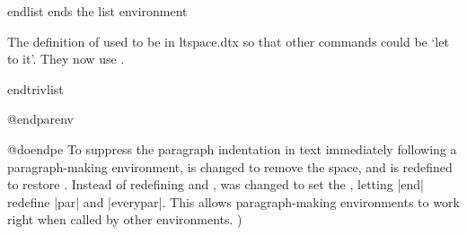  \begin{docCommand}{endlist} {  }
  ends the list environment
 \end{docCommand}
     \begin{teX}
\def\endlist{%
  \global\advance\@listdepth\m@ne
  \endtrivlist}
    \end{teX}
 

    The definition of  used to be in ltspace.dtx 
    so that other commands could be `let to it'.  
    They now use .
 \begin{docCommand}{endtrivlist}{}
 \end{docCommand}
 
    \begin{teX}
\def\endtrivlist{%
  \if@inlabel
    \leavevmode
    \global \@inlabelfalse
  \fi
  \if@newlist
    \@noitemerr
    \global \@newlistfalse
  \fi
  \ifhmode\unskip \par
    \end{teX}
    We also check if we are in math mode and issue an error message
    if so (hoping that |\@currenvir| resolves suitably). Otherwise
    the usual ``perhaps a missing item'' error will get triggered
    later which is confusing.
 \changes{v1.0s}{2002/10/28}{Check for math mode (pr/3437)}
    \begin{teX}
  \else
    \@inmatherr{\end{\@currenvir}}%
  \fi
  \if@noparlist \else
    \ifdim\lastskip >\z@
      \@tempskipa\lastskip \vskip -\lastskip
      \advance\@tempskipa\parskip \advance\@tempskipa -\@outerparskip
      \vskip\@tempskipa
    \fi
    \@endparenv
  \fi
}
    \end{teX}
 

  \begin{docCommand}{@endparenv}{}
 \end{docCommand}
 
 

 
\begin{docCommand}{@doendpe}{}
   To suppress the paragraph indentation in text immediately following
   a paragraph-making environment,  is changed to remove the
   space, and  is redefined to restore .  Instead of
   redefining  and ,  was changed to 
   set the , letting |end| redefine |par| and 
   |everypar|.   This allows paragraph-making environments to work right when called 
 by other environments. )
\end{docCommand}
 
